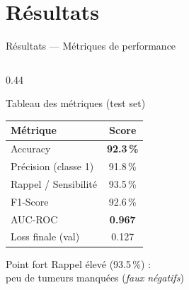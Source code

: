 \documentclass[aspectratio=169, 12pt]{beamer}
\begin{document}
\section{Résultats}

\begin{frame}{Résultats — Métriques de performance}
  \begin{columns}[T]

    \begin{column}{0.44\textwidth}
      \begin{block}{\faChartBar\; Tableau des métriques (test set)}
        \small
        \begin{tabular}{@{}lc@{}}
          \toprule
          \textbf{Métrique}     & \textbf{Score} \\
          \midrule
          Accuracy              & \textbf{92.3\,\%} \\
          Précision (classe 1)  & 91.8\,\% \\
          Rappel / Sensibilité  & 93.5\,\% \\
          F1-Score              & 92.6\,\% \\
          AUC-ROC               & \textbf{0.967} \\
          Loss finale (val)     & 0.127 \\
          \bottomrule
        \end{tabular}
      \end{block}

      \vspace{0.4em}
      \begin{exampleblock}{\faThumbsUp\; Point fort}
        Rappel élevé (93.5\,\%) :\\
        peu de tumeurs manquées (\textit{faux négatifs})
      \end{exampleblock}
    \end{column}


\end{columns}
\end{frame}
\end{document}
